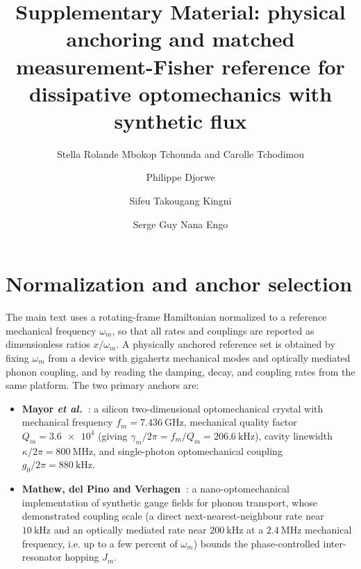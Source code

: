 \documentclass[aip,cha,reprint]{revtex4-2}
\begin{document}
\title{Supplementary Material: physical anchoring and matched measurement-Fisher reference for dissipative optomechanics with synthetic flux}
\author{Stella Rolande Mbokop Tchounda and Carolle Tchodimou}

\author{Philippe Djorwe}

\author{Sifeu Takougang Kingni}

\author{Serge Guy Nana Engo}

\maketitle

\section{Normalization and anchor selection}

The main text uses a rotating-frame Hamiltonian normalized to a reference
mechanical frequency $\omega_m$, so that all rates and couplings are reported as
dimensionless ratios $x/\omega_m$. A physically anchored reference set is obtained by
fixing $\omega_m$ from a device with gigahertz mechanical modes and optically mediated
phonon coupling, and by reading the damping, decay, and coupling rates from the same
platform. The two primary anchors are:

\begin{itemize}
\item \textbf{Mayor \emph{et al.}~\cite{Mayor2025}}: a silicon two-dimensional optomechanical
crystal with mechanical frequency $f_m = \SI{7.436}{\giga\hertz}$, mechanical quality
factor $Q_m = \num{3.6e4}$ (giving $\gamma_m/2\pi = f_m/Q_m = \SI{206.6}{\kilo\hertz}$),
cavity linewidth $\kappa/2\pi = \SI{800}{\mega\hertz}$, and single-photon
optomechanical coupling $g_0/2\pi = \SI{880}{\kilo\hertz}$.
\item \textbf{Mathew, del Pino and Verhagen~\cite{Mathew2020}}: a nano-optomechanical
implementation of synthetic gauge fields for phonon transport, whose demonstrated
coupling scale (a direct next-nearest-neighbour rate near $\SI{10}{\kilo\hertz}$ and an
optically mediated rate near $\SI{200}{\kilo\hertz}$ at a $\SI{2.4}{\mega\hertz}$
mechanical frequency, i.e. up to a few percent of $\omega_m$) bounds the
phase-controlled inter-resonator hopping $J_m$.
\end{itemize}
\end{document}
